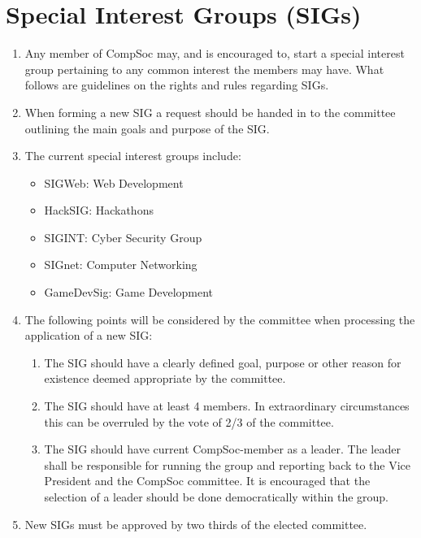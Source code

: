 \section{Special Interest Groups (SIGs)}

\begin{enumerate}

\item Any member of CompSoc may, and is encouraged to, start a special interest group pertaining to any common interest the members may have. What follows are guidelines on the rights and rules regarding SIGs.

\item When forming a new SIG a request should be handed in to the committee outlining the main goals and purpose of the SIG\@.

\item The current special interest groups include:
  \begin{itemize}
  \item SIGWeb: Web Development
  \item HackSIG\@: Hackathons
  \item SIGINT\@: Cyber Security Group
  \item SIGnet: Computer Networking
  \item GameDevSig: Game Development
  \end{itemize}

\item The following points will be considered by the committee when processing the application of a new SIG\@:
  \begin{enumerate}
  \item The SIG should have a clearly defined goal, purpose or other reason for existence deemed appropriate by the committee.
  \item The SIG should have at least 4 members. In extraordinary circumstances this can be overruled by the vote of 2/3 of the committee.
  \item The SIG should have current CompSoc-member as a leader. The leader shall be responsible for running the group and reporting back to the Vice President and the CompSoc committee. It is encouraged that the selection of a leader should be done democratically within the group.
  \end{enumerate}

\item New SIGs must be approved by two thirds of the elected committee.


\end{enumerate}
